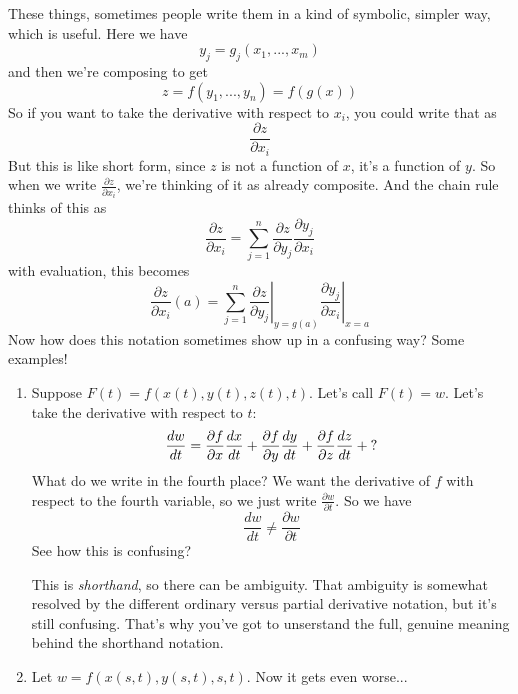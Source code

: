 \documentclass{article}
\newcommand{\prt}[2]{\frac{\partial #1}{\partial #2}}
\begin{document}
These things, sometimes people write them in a kind of symbolic, simpler way, which is useful. Here we have
\begin{equation}y_j = g_j(x_1,...,x_m)\end{equation}
and then we're composing to get
\begin{equation}z = f(y_1,...,y_n) = f(g(x))\end{equation}
So if you want to take the derivative with respect to \(x_i\), you could write that as
\begin{equation}\prt{z}{x_i}\end{equation}
But this is like short form, since \(z\) is not a function of \(x\), it's a function of \(y\). So when we write \(\prt{z}{x_i}\), we're thinking of it as already composite. And the chain rule thinks of this as
\begin{equation}\prt{z}{x_i} = \sum_{j = 1}^n\prt{z}{y_j}\prt{y_j}{x_i}\end{equation}
with evaluation, this becomes
\begin{equation}\prt{z}{x_i}(a) = \sum_{j = 1}^n\left.\prt{z}{y_j}\right|_{y = g(a)}\left.\prt{y_j}{x_i}\right|_{x = a}\end{equation}
Now how does this notation sometimes show up in a confusing way? Some examples!
\begin{enumerate}
  \item Suppose \(F(t) = f(x(t), y(t), z(t), t)\). Let's call \(F(t) = w\). Let's take the derivative with respect to \(t\):
  \begin{equation}\frac{dw}{dt} = \prt{f}{x}\frac{dx}{dt} + \prt{f}{y}\frac{dy}{dt} + \prt{f}{z}\frac{dz}{dt} + \\ ?\end{equation}
  What do we write in the fourth place? We want the derivative of \(f\) with respect to the fourth variable, so we just write \(\prt{w}{t}\). So we have
  \begin{equation}\frac{dw}{dt} \neq \prt{w}{t}\end{equation}
  See how this is confusing?

  This is \textit{shorthand}, so there can be ambiguity. That ambiguity is somewhat resolved by the different ordinary versus partial derivative notation, but it's still confusing. That's why you've got to unserstand the full, genuine meaning behind the shorthand notation.

  \item Let \(w = f(x(s, t), y(s, t), s, t)\). Now it gets even worse...
\end{enumerate}
\end{document}
